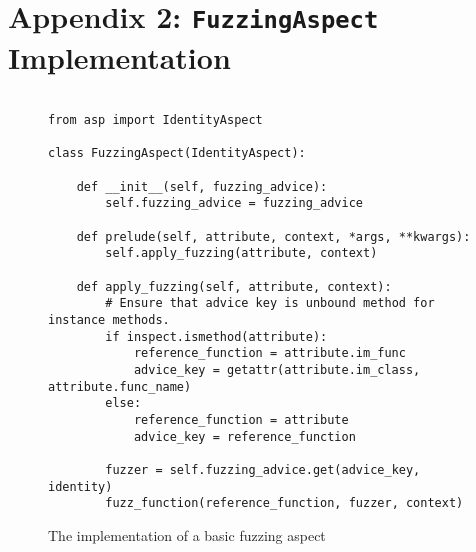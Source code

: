 \documentclass[draft]{article}
\begin{document}
\newpage
\section*{Appendix 2: \texttt{FuzzingAspect} Implementation}
\label{app:fuzzing_aspect}

\begin{figure}[H]
  \begin{lstlisting}

from asp import IdentityAspect
    
class FuzzingAspect(IdentityAspect):

    def __init__(self, fuzzing_advice):
        self.fuzzing_advice = fuzzing_advice

    def prelude(self, attribute, context, *args, **kwargs):
        self.apply_fuzzing(attribute, context)

    def apply_fuzzing(self, attribute, context):
        # Ensure that advice key is unbound method for instance methods.
        if inspect.ismethod(attribute):
            reference_function = attribute.im_func
            advice_key = getattr(attribute.im_class, attribute.func_name)
        else:
            reference_function = attribute
            advice_key = reference_function

        fuzzer = self.fuzzing_advice.get(advice_key, identity)
        fuzz_function(reference_function, fuzzer, context)
  \end{lstlisting}
  \label{fig:fuzzing_aspect_code}
  \caption{The implementation of a basic fuzzing aspect}
\end{figure}
\end{document}
